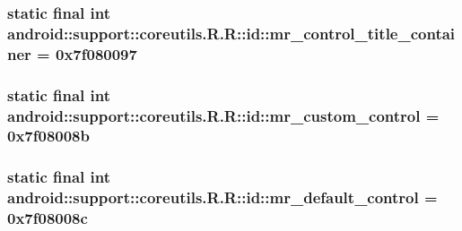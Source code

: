 \hypertarget{classandroid_1_1support_1_1coreutils_1_1_r_1_1id_3b1bd803744b54ecf80283a8dda2ced1}{
\subsubsection[{mr\_\-control\_\-title\_\-container}]{\setlength{\rightskip}{0pt plus 5cm}static final int android::support::coreutils.R.R::id::mr\_\-control\_\-title\_\-container = 0x7f080097}}
\label{classandroid_1_1support_1_1coreutils_1_1_r_1_1id_3b1bd803744b54ecf80283a8dda2ced1}


\hypertarget{classandroid_1_1support_1_1coreutils_1_1_r_1_1id_b3f23e2201ba67095e47c96b0029c3cf}{
\subsubsection[{mr\_\-custom\_\-control}]{\setlength{\rightskip}{0pt plus 5cm}static final int android::support::coreutils.R.R::id::mr\_\-custom\_\-control = 0x7f08008b}}
\label{classandroid_1_1support_1_1coreutils_1_1_r_1_1id_b3f23e2201ba67095e47c96b0029c3cf}


\hypertarget{classandroid_1_1support_1_1coreutils_1_1_r_1_1id_dd1d57252810bf62f24f7f5264c54c86}{
\subsubsection[{mr\_\-default\_\-control}]{\setlength{\rightskip}{0pt plus 5cm}static final int android::support::coreutils.R.R::id::mr\_\-default\_\-control = 0x7f08008c}}
\label{classandroid_1_1support_1_1coreutils_1_1_r_1_1id_dd1d57252810bf62f24f7f5264c54c86}


